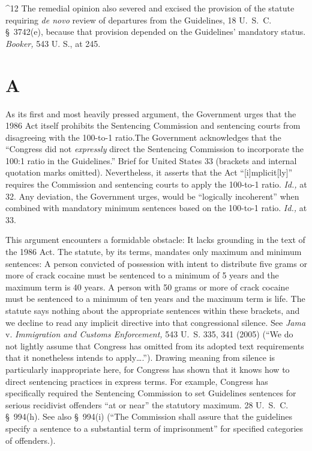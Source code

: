 {{^12 The remedial opinion also severed and excised the provision of the
statute requiring \emph{de novo} review of departures from the Guidelines,
18 U.~S.~C. \S~3742(e), because that provision depended on the
Guidelines' mandatory status. \emph{Booker,} 543 U. S., at 245.

\section{A}

  As its first and most heavily pressed argument, the Government urges
that the 1986 Act itself prohibits the Sentencing Commission and
sentencing courts from disagreeing with the 100-to-1 ratio.\footnotemark[13] The
Government acknowledges that the ``Congress did not \emph{expressly}
direct the Sentencing Commission to incorporate the 100:1 ratio in the
Guidelines.'' Brief for United States 33 (brackets and internal
quotation marks omitted). Nevertheless, it asserts that the Act
``[i]mplicit[ly]'' requires the Commission and sentencing courts
to apply the 100-to-1 ratio. \emph{Id.,} at 32. Any deviation, the
Government urges, would be ``logically incoherent'' when combined with
mandatory minimum sentences based on the 100-to-1 ratio. \emph{Id.,} at
33.

  This argument encounters a formidable obstacle: It lacks grounding
in the text of the 1986 Act. The statute, by its terms, mandates only
maximum and minimum sentences: A person convicted of possession with
intent to distribute five grams or more of crack cocaine must be
sentenced to a mini\newpage mum of 5 years and the maximum term is 40
years. A person with 50 grams or more of crack cocaine must be sentenced
to a minimum of ten years and the maximum term is life. The statute
says nothing about the appropriate sentences within these brackets,
and we decline to read any implicit directive into that congressional
silence. See \emph{Jama} v. \emph{Immigration and Customs Enforcement,}
543 U.~S. 335, 341 (2005) (``We do not lightly assume that Congress
has omitted from its adopted text requirements that it nonetheless
intends to apply\dots .''). Drawing meaning from silence is
particularly inappropriate here, for Congress has shown that it knows
how to direct sentencing practices in express terms. For example,
Congress has specifically required the Sentencing Commission to set
Guidelines sentences for serious recidivist offenders ``at or near''
the statutory maximum. 28 U.~S.~C. \S~994(h). See also \S~994(i)
(``The Commission shall assure that the guidelines specify a sentence
to a substantial term of imprisonment'' for specified categories of
offenders.).

}}
